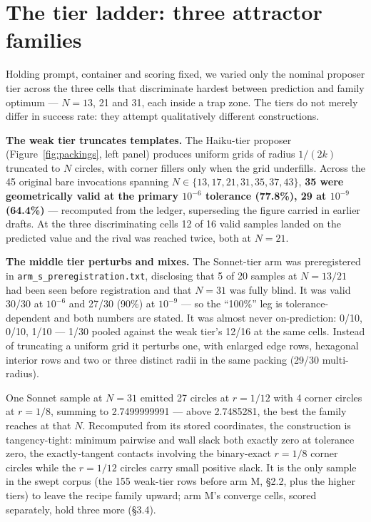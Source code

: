 \section{The tier ladder: three attractor families}

Holding prompt, container and scoring fixed, we varied only the nominal proposer tier across
the three cells that discriminate hardest between prediction and family optimum --- $N = 13$, 21
and 31, each inside a trap zone. The tiers do not merely differ in success rate: they attempt
qualitatively different constructions.

\textbf{The weak tier truncates templates.} The Haiku-tier proposer (Figure~\ref{fig:packings}, left panel) produces uniform grids of radius
$1/(2k)$ truncated to $N$ circles, with corner fillers only when the grid underfills. Across the 45
original bare invocations spanning $N \in \{13, 17, 21, 31, 35, 37, 43\}$, \textbf{35 were geometrically
valid at the primary $10^{-6}$ tolerance (77.8\%), 29 at $10^{-9}$ (64.4\%)} --- recomputed from the ledger,
superseding the figure carried in earlier drafts. At the three discriminating cells 12 of 16 valid samples
landed on the predicted value and the rival was reached twice, both at $N = 21$.

\textbf{The middle tier perturbs and mixes.} The Sonnet-tier arm was preregistered in
\texttt{arm\_s\_preregistration.txt}, disclosing that 5 of 20 samples at $N = 13/21$ had been seen before
registration and that $N = 31$ was fully blind. It was valid 30/30 at $10^{-6}$ and 27/30 (90\%) at
$10^{-9}$ --- so the ``100\%'' leg is tolerance-dependent and both numbers are stated. It was almost
never on-prediction: 0/10, 0/10, 1/10 --- 1/30 pooled against the weak tier's 12/16 at the same
cells. Instead of truncating a uniform grid it perturbs one, with enlarged edge rows, hexagonal
interior rows and two or three distinct radii in the same packing (29/30 multi-radius).

One Sonnet sample at $N = 31$ emitted 27 circles at $r = 1/12$ with 4 corner circles at $r = 1/8$,
summing to 2.7499999991 --- above 2.7485281, the best the family reaches at that $N$. Recomputed
from its stored coordinates, the construction is tangency-tight: minimum pairwise and wall slack
both exactly zero at tolerance zero, the exactly-tangent contacts involving the binary-exact
$r = 1/8$ corner circles while the $r = 1/12$ circles carry small positive slack. It is the only
sample in the swept corpus (the 155 weak-tier rows before arm M, \S2.2, plus the higher tiers) to leave the recipe family upward; arm M's converge cells, scored separately, hold three more (\S3.4).

